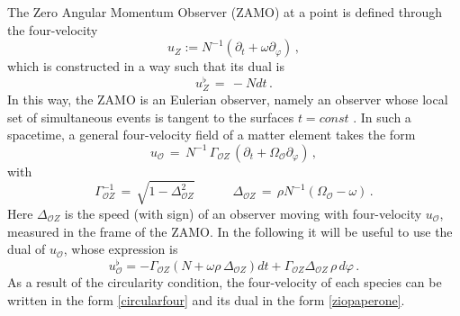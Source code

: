 \documentclass[usenatbib%
]{mnras}
\newcommand{\spc}{\quad \quad \quad}
\begin{document}
The Zero Angular Momentum Observer (ZAMO) at a point is defined through the four-velocity
\begin{equation}
u_Z := N^{-1} (\partial_t + \omega \partial_\varphi) \, ,
\end{equation}
which is constructed in a way such that its dual is
\begin{equation}\label{perch lui}
u_Z^\flat  \, =  \,  -N dt  \, .
\end{equation}
In this way, the ZAMO is an Eulerian observer, namely an observer whose local set of simultaneous 
events is tangent to the surfaces $t=const$  \citep{rezzolla_book, Gourgoulhon3+1}.
In such a spacetime, a general four-velocity field of a matter element takes the form
\begin{equation}\label{circularfour}
u_{\mathcal{O}} 
\, = \, 
{N}^{-1} \, {\Gamma_{\mathcal{O}Z}} \, (\partial_t  + \Omega_\mathcal{O} \partial_\varphi) \, , 
\end{equation}
with
\begin{equation}\label{quarantetre}
\Gamma_{\mathcal{O}Z}^{-1}  \, = \, \sqrt{1-\Delta_{\mathcal{O}Z}^2}  
\spc 
\Delta_{\mathcal{O}Z} \, = \, \rho N^{-1} (\Omega_\mathcal{O} -\omega) \, .
\end{equation}
Here $\Delta_{\mathcal{O}Z}$ is the speed (with sign) of an observer moving with four-velocity $u_\mathcal{O}$,  measured in the frame of the ZAMO. 
In the following it will be useful to use the dual of $u_\mathcal{O}$, whose expression is 
\begin{equation}\label{ziopaperone}
u_\mathcal{O}^\flat
=
-\Gamma_{\mathcal{O}Z} (N+ \omega \rho \, \Delta_{ \mathcal{O} Z }) dt 
+ 
\Gamma_{\mathcal{O}Z} \Delta_{ \mathcal{O} Z } \, \rho \, d\varphi \, .
\end{equation}
As a result of the circularity condition, the four-velocity of each species can be written in the  form \eqref{circularfour} and its dual in the form \eqref{ziopaperone}.



\end{document}
